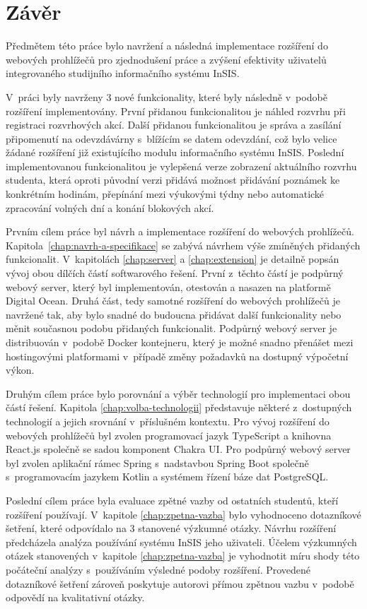 \chapter*{Závěr}

Předmětem této práce bylo navržení a následná implementace rozšíření do webových prohlížečů pro zjednodušení práce a zvýšení efektivity uživatelů integrovaného studijního informačního systému InSIS.

V~práci byly navrženy 3 nové funkcionality, které byly následně v~podobě rozšíření implementovány. První přidanou funkcionalitou je náhled rozvrhu při registraci rozvrhových akcí. Další přidanou funkcionalitou je správa a zasílání připomenutí na odevzdávárny s~blížícím se datem odevzdání, což bylo velice žádané rozšíření již existujícího modulu informačního systému InSIS. Poslední implementovanou funkcionalitou je vylepšená verze zobrazení aktuálního rozvrhu studenta, která oproti původní verzi přidává možnost přidávání poznámek ke konkrétním hodinám, přepínání mezi výukovými týdny nebo automatické zpracování volných dní a konání blokových akcí.

Prvním cílem práce byl návrh a implementace rozšíření do webových prohlížečů. Kapitola~\ref{chap:navrh-a-specifikace} se zabývá návrhem výše zmíněných přidaných funkcionalit. V~kapitolách \ref{chap:server} a \ref{chap:extension} je detailně popsán vývoj obou dílčích částí softwarového řešení. První z~těchto částí je podpůrný webový server, který byl implementován, otestován a nasazen na platformě Digital Ocean. Druhá část, tedy samotné rozšíření do webových prohlížečů je navržené tak, aby bylo snadné do budoucna přidávat další funkcionality nebo měnit současnou podobu přidaných funkcionalit. Podpůrný webový server je distribuován v~podobě Docker kontejneru, který je možné snadno přenášet mezi hostingovými platformami v~případě změny požadavků na dostupný výpočetní výkon. 

Druhým cílem práce bylo porovnání a výběr technologií pro implementaci obou částí řešení. Kapitola \ref{chap:volba-technologii} představuje některé z~dostupných technologií a jejich srovnání v~příslušném kontextu. Pro vývoj rozšíření do webových prohlížečů byl zvolen programovací jazyk TypeScript a knihovna React.js společně se sadou komponent Chakra UI. Pro podpůrný webový server byl zvolen aplikační rámec Spring s~nadstavbou Spring Boot společně s~programovacím jazykem Kotlin a systémem řízení báze dat PostgreSQL. 

Poslední cílem práce byla evaluace zpětné vazby od ostatních studentů, kteří rozšíření používají. V~kapitole \ref{chap:zpetna-vazba} bylo vyhodnoceno dotazníkové šetření, které odpovídalo na 3 stanovené výzkumné otázky. Návrhu rozšíření předcházela analýza používání systému InSIS jeho uživateli. Účelem výzkumných otázek stanovených v~kapitole \ref{chap:zpetna-vazba} je vyhodnotit míru shody této počáteční analýzy s~používáním výsledné podoby rozšíření. Provedené dotazníkové šetření zároveň poskytuje autorovi přímou zpětnou vazbu v~podobě odpovědí na kvalitativní otázky.

